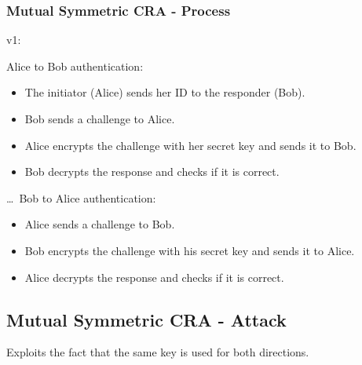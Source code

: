 \subsubsection*{Mutual Symmetric CRA - Process}
\begin{center}
    v1:
\end{center}
Alice to Bob authentication:
\begin{itemize}
    \item The initiator (Alice) sends her ID to the responder (Bob).
    \item Bob sends a challenge to Alice.
    \item Alice encrypts the challenge with her secret key and sends it to Bob.
    \item Bob decrypts the response and checks if it is correct.
\end{itemize}
\dots\ Bob to Alice authentication:
\begin{itemize}
    \item Alice sends a challenge to Bob.
    \item Bob encrypts the challenge with his secret key and sends it to Alice.
    \item Alice decrypts the response and checks if it is correct.
\end{itemize}

\subsection*{Mutual Symmetric CRA - Attack}
\begin{center}
    Exploits the fact that the same key is used for both directions.
\end{center}




